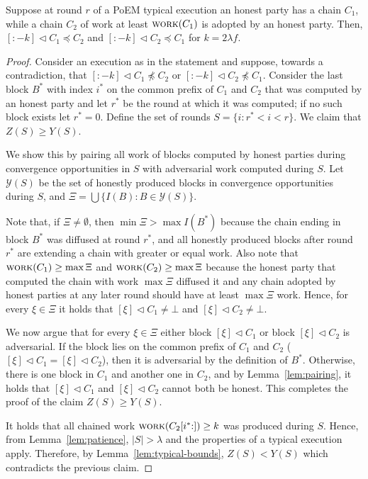 \begin{lemma}
  Suppose at round $r$ of a PoEM typical execution an honest party has a chain
  $C_1$, while a chain $C_2$ of work at least $\textsc{work}(C_1)$ is adopted by an honest party.
  Then, $[{:}{-k}] \lhd C_1 \preccurlyeq C_2$ and $[{:}{-k}] \lhd C_2 \preccurlyeq C_1$
  for $k = 2 \lambda f$.
\end{lemma}
\begin{proof}
    Consider an execution as in the statement and suppose,
    towards a contradiction, that $[{:}{-k}] \lhd C_1 \not \preccurlyeq C_2$
    or $[{:}{-k}] \lhd C_2 \not \preccurlyeq C_1$.
    Consider the last block $B^*$ with index $i^*$ on the common prefix of
    $C_1$ and $C_2$ that was computed by an honest party and let $r^*$
    be the round at which it was computed; if no such block exists let $r^* = 0$.
    Define the set of rounds $S = \{i: r^* < i < r\}$. We claim that
    $Z(S) \geq Y(S)$.

    We show this by pairing all work of blocks computed by honest parties during
    convergence opportunities in $S$ with adversarial work computed during $S$.
    Let $\mathcal{Y}(S)$ be the set of honestly produced blocks in convergence opportunities
    during $S$, and $\Xi = \bigcup \{I(B): B \in \mathcal{Y}(S)\}$.

    Note that, if $\Xi \neq \emptyset$, then $\min{\Xi} > \max{I(B^*)}$
    because the chain ending in block $B^*$
    was diffused at round $r^*$, and all honestly produced blocks after round $r^*$
    are extending a chain with greater or equal work.
    Also note that $\textsc{work}(C_1) \geq \max{\Xi}$ and $\textsc{work}(C_2) \geq \max{\Xi}$ because
    the honest party that computed the chain with work $\max \Xi$ diffused it and any chain adopted
    by honest parties at any later round should have at least $\max \Xi$ work.
    Hence, for every $\xi \in \Xi$ it holds that
    $[\xi] \lhd C_1 \neq \bot$ and $[\xi] \lhd C_2 \neq \bot$.

    We now argue that for every $\xi \in \Xi$ either block $[\xi] \lhd C_1$
    or block $[\xi] \lhd C_2$ is adversarial. If the block lies on the
    common prefix of $C_1$ and $C_2$ ($[\xi] \lhd C_1 = [\xi] \lhd C_2$),
    then it is adversarial by the definition of $B^*$. Otherwise,
    there is one block in $C_1$ and another one in $C_2$, and by
    Lemma~\ref{lem:pairing}, it holds that $[\xi] \lhd C_1$ and
    $[\xi] \lhd C_2$ cannot both be honest.
    This completes the proof of the claim $Z(S) \geq Y(S)$.

    It holds that all chained work $\textsc{work}(C_2[{i^*} {:}]) \geq k$
    was produced during $S$.
    Hence, from Lemma~\ref{lem:patience}, $|S| > \lambda$ and
    the properties of a typical execution apply.
    Therefore, by Lemma~\ref{lem:typical-bounds},
    $Z(S) < Y(S)$ which contradicts the previous claim. \Qed
\end{proof}

